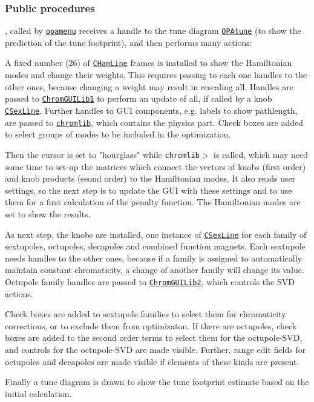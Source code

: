 \documentclass[12pt]{article}
\newcommand\code[1]{{\tt #1}}
\newcommand\guico[1]{{\color{blue}\code{#1}}}
\newcommand{\unico}[1]{{\color{burntorange}\code{#1}}}
\newcommand{\prcod}[2]{\opauni{#1}$>$\unico{#2}}
\newcommand{\opagui}[1]{\colorbox{blue!20}{\code{#1}}}
\newcommand{\ogui}[1]{\hyperref[#1]{\opagui{#1}}}
\newcommand{\opaguif}[1]{\colorbox{violet!30}{\code{#1}}}
\newcommand{\oguif}[1]{\hyperref[#1]{\opaguif{#1}}}
\newcommand{\opauni}[1]{\colorbox{orange!30}{\code{#1}}}
\newcommand{\ouni}[1]{\hyperref[#1]{\opauni{#1}}}
\newcommand{\ppro}[1]{\subsubsection*{Public procedures} #1}
\begin{document}
\ppro{
\guico{Start}, called by \ogui{opamenu} receives a handle to the tune diagram \ogui{OPAtune} (to show the prediction of the tune footprint), and then performs many actions:

A fixed number (26) of \oguif{CHamLine} frames is installed to show the Hamiltonian modes and change their weights. This requires passing to each one handles to the other ones, because changing a weight may result in rescaling all. Handles are passed to \ouni{ChromGUILib1} to perform an update of all, if called by a knob \oguif{CSexLine}. Further handles to GUI components, e.g. labels to show pathlength, are passed to \ouni{chromlib}, which contains the physics part. Check boxes are added to select groups of modes to be included in the optimization.

Then the cursor is set to "hourglass" while \prcod{chromlib}{ChromInit} is called, which may need some time to set-up the matrices which connect the vectors of knobs (first order) and knob products (seond order) to the Hamiltonian modes. It also reads user settings, so the next step is to update the GUI with these settings and to use them for a first calculation of the penalty function. The Hamiltonian modes are set to show the results.

As next step, the knobs are installed, one instance of \oguif{CSexLine} for each family of sextupoles, octupoles, decapoles and combined function magnets. Each sextupole needs handles to the other ones, because if a family is assigned to automatically maintain constant chromaticity, a change of another family will change its value. Octupole family handles are passed to \ouni{ChromGUILib2}, which controls the SVD actions. 

Check boxes are added to sextupole families to select them for chromaticity corrections, or to exclude them from optimizaton. If there are octupoles, check boxes are added to the second order terms to select them for the octupole-SVD, and controls for the octupole-SVD are made visible. Further, range edit fields for octupoles and decapoles are made visible if elements of these kinds are present.

Finally a tune diagram is drawn to show the tune footprint estimate based on the initial calculation. 
}
\end{document}
